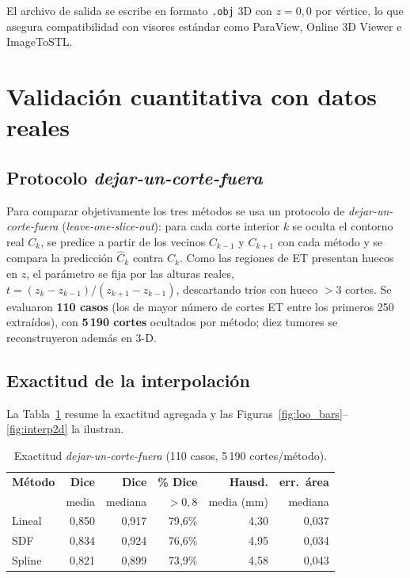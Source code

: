 \documentclass[conference]{IEEEtran}
\begin{document}
El archivo de salida se escribe en formato \texttt{.obj}
3D con $z = 0{,}0$ por vértice, lo que asegura compatibilidad
con visores estándar como ParaView, Online 3D Viewer e
ImageToSTL.

\section{Validación cuantitativa con datos reales}
\label{sec:validacion}

\subsection{Protocolo \emph{dejar-un-corte-fuera}}
Para comparar objetivamente los tres métodos se usa un protocolo de
\emph{dejar-un-corte-fuera} (\emph{leave-one-slice-out}): para cada corte
interior $k$ se oculta el contorno real $C_k$, se predice a partir de los
vecinos $C_{k-1}$ y $C_{k+1}$ con cada método y se compara la predicción
$\hat C_k$ contra $C_k$. Como las regiones de ET presentan huecos en $z$,
el parámetro se fija por las alturas reales,
$t=(z_k-z_{k-1})/(z_{k+1}-z_{k-1})$, descartando tríos con hueco $>3$
cortes. Se evaluaron \textbf{110 casos} (los de mayor número de cortes ET
entre los primeros 250 extraídos), con \textbf{5\,190 cortes} ocultados por
método; diez tumores se reconstruyeron además en 3-D.

\subsection{Exactitud de la interpolación}
La Tabla~\ref{tab:loo} resume la exactitud agregada y las
Figuras~\ref{fig:loo_bars}--\ref{fig:interp2d} la ilustran.

\begin{table}[!t]
\centering
\caption{Exactitud \emph{dejar-un-corte-fuera} (110 casos,
5\,190 cortes/método).}
\label{tab:loo}
\renewcommand{\arraystretch}{1.15}
\footnotesize
\begin{tabular}{@{}lrrrrr@{}}
\toprule
\textbf{Método} & \textbf{Dice} & \textbf{Dice} & \textbf{\% Dice} &
\textbf{Hausd.} & \textbf{err.\ área} \\
 & media & mediana & $>0{,}8$ & media (mm) & mediana \\
\midrule
Lineal & 0{,}850 & 0{,}917 & 79{,}6\% & 4{,}30 & 0{,}037 \\
SDF    & 0{,}834 & 0{,}924 & 76{,}6\% & 4{,}95 & 0{,}034 \\
Spline & 0{,}821 & 0{,}899 & 73{,}9\% & 4{,}58 & 0{,}043 \\
\bottomrule
\end{tabular}
\end{table}
\end{document}
